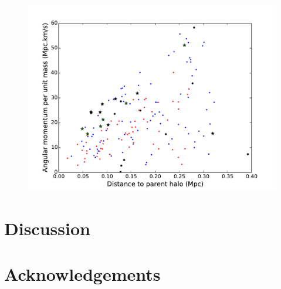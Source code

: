 \documentclass[useAMS,usenatbib]{mn2e}
\begin{document}
\begin{figure}
\centering
\includegraphics[width=\hsize]{Halo_pos_LRomulusRemus.pdf}\\
\end{figure}
\section{Discussion} 
\section{Acknowledgements}





\label{lastpage}
\end{document}
